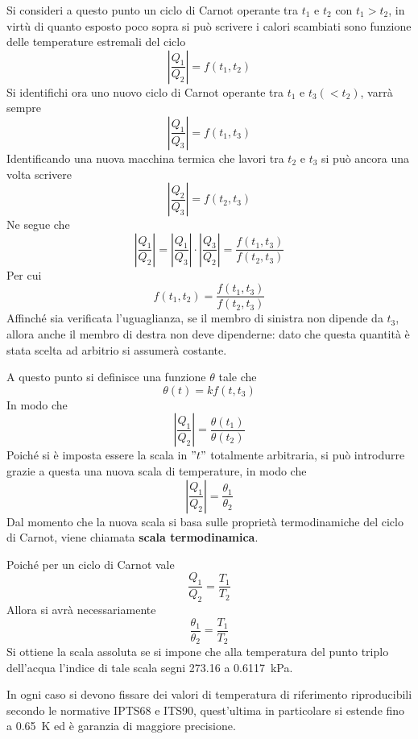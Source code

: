 \documentclass[a4paper, 15pt]{article}
\begin{document}
\begin{adjustwidth}{2in}{}
	Si consideri a questo punto un ciclo di Carnot operante tra $t_1$ e $t_2$ con $t_1>t_2$, in virtù di quanto esposto poco sopra si può scrivere i calori scambiati sono funzione delle temperature estremali del ciclo
	\[\left|\dfrac{Q_1}{Q_2}\right| = f(t_1,t_2)\]
	Si identifichi ora uno nuovo ciclo di Carnot operante tra $t_1$ e $t_3(<t_2)$, varrà sempre
	\[\left|\dfrac{Q_1}{Q_3}\right| = f(t_1,t_3)\]	
	Identificando una nuova macchina termica che lavori tra $t_2$ e $t_3$ si può ancora una volta scrivere
	\[\left|\dfrac{Q_2}{Q_3}\right| = f(t_2,t_3)\]	
	Ne segue che
	\[\left|\dfrac{Q_1}{Q_2}\right| = \left|\dfrac{Q_1}{Q_3}\right|\cdot\left|\dfrac{Q_3}{Q_2}\right| = \dfrac{f(t_1,t_3)}{f(t_2,t_3)}\]	
	Per cui
	\[f(t_1,t_2) = \dfrac{f(t_1,t_3)}{f(t_2,t_3)}\]
	Affinché sia verificata l'uguaglianza, se il membro di sinistra non dipende da $t_3$, allora anche il membro di destra non deve dipenderne: dato che questa quantità è stata scelta ad arbitrio si assumerà costante. \newline
	
	A questo punto si definisce una funzione $\theta$ tale che
	\[\theta(t) = kf(t,t_3)\]
	In modo che 
	\[\left|\dfrac{Q_1}{Q_2}\right| = \dfrac{\theta(t_1)}{\theta(t_2)}\]
	Poiché si è imposta essere la scala in $"t"$ totalmente arbitraria, si può introdurre grazie a questa una nuova scala di temperature, in modo che 
	\[\left|\dfrac{Q_1}{Q_2}\right| = \dfrac{\theta_1}{\theta_2}\]
	Dal momento che la nuova scala si basa sulle proprietà termodinamiche del ciclo di Carnot, viene chiamata \textbf{scala termodinamica}.  
	
	Poiché per un ciclo di Carnot vale 
	\[\dfrac{Q_1}{Q_2} = \dfrac{T_1}{T_2}\] 
	Allora si avrà necessariamente 
	\[\dfrac{\theta_1}{\theta_2} = \dfrac{T_1}{T_2}\]
	Si ottiene la scala assoluta se si impone che alla temperatura del punto triplo dell'acqua l'indice di tale scala segni 273.16 a \SI{0.6117}{\kilo\Pa}. 
	
	In ogni caso si devono fissare dei valori di temperatura di riferimento riproducibili secondo le normative IPTS68 e ITS90, quest'ultima in particolare si estende fino a \SI{0.65}{\kelvin} ed è garanzia di maggiore precisione.
\end{adjustwidth}
\newpage
\end{document}
